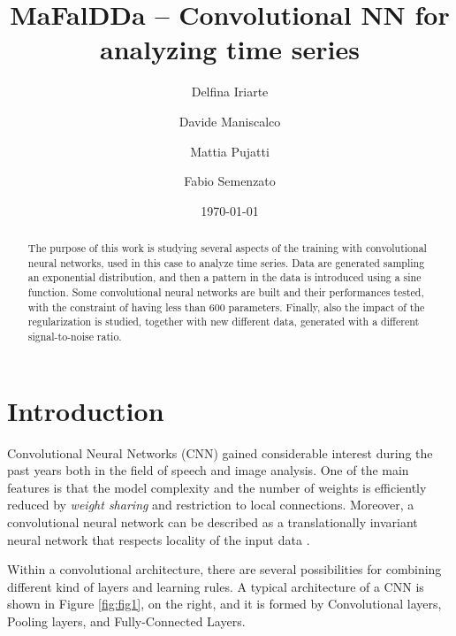 \documentclass[prl, twocolumn]{revtex4-1}
\begin{document}
\title{MaFalDDa -- Convolutional NN for analyzing time series}

\author{Delfina Iriarte}
\author{Davide Maniscalco}
\author{Mattia Pujatti}
\author{Fabio Semenzato}
\date{\today}

\begin{abstract}
  The purpose of this work is studying several aspects of the training with convolutional neural networks, used in this case to analyze time series. Data are generated sampling an exponential distribution, and then a pattern in the data is introduced using a sine function. Some convolutional neural networks are built and their performances tested, with the constraint of having less than 600 parameters. Finally, also the impact of the regularization is studied, together with new different data, generated with a different signal-to-noise ratio.
\end{abstract}

\maketitle
\section{Introduction}

Convolutional Neural Networks (CNN) gained considerable interest during the past years both in the field of speech and image analysis. One of the main features is that the model complexity and the number of weights is efficiently reduced by \textit{weight sharing} and restriction to local connections. Moreover, a convolutional neural network can be described as a translationally invariant neural network that respects locality of the input data \cite{Metha}. \

Within a convolutional architecture, there are several possibilities for combining different kind of layers and learning rules. A typical architecture of a CNN is shown in Figure \ref{fig:fig1}, on the right, and it is formed by Convolutional layers, Pooling layers, and Fully-Connected Layers. 
\end{document}
